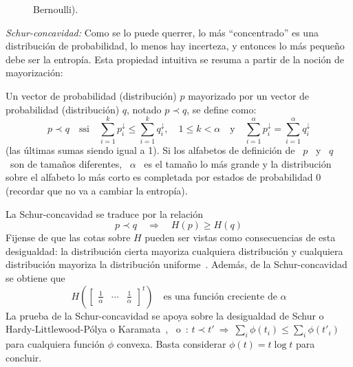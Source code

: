 \begin{propiedades}
\begin{figure}[h!]
{    Bernoulli).}
  \label{fig:SZ:Concavidad}
  \end{figure}
%
\setcounter{PropSchurConcavidad}{\value{enumi}}
\item\label{prop:SZ:Schurconcavidad}  {\it Schur-concavidad:}  Como se  lo puede
  querrer, lo  m\'as ``concentrado'' es  una distribuci\'on de  probabilidad, lo
  menos   hay  incerteza,   y  entonces   lo   m\'as  peque\~no   debe  ser   la
  entrop\'ia.  Esta propiedad intuitiva  se resuma  a partir  de la  noci\'on de
  mayorizaci\'on:
  \begin{definicion}[Mayorizaci\'on]\label{def:SZ:Mayorizacion}
    Un vector de  probabilidad (distribuci\'on) $p$ mayorizado por  un vector de
    probabilidad (distribuci\'on) $q$, notado $p \prec q$, se define como:
    \[
    p   \prec  q   \quad  \mbox{ssi}   \quad  \sum_{i=1}^k   p_i^\downarrow  \le
    \sum_{i=1}^k q_i^\downarrow,  \quad 1  \le k <  \alpha \quad  \mbox{y} \quad
    \sum_{i=1}^\alpha p_i^\downarrow = \sum_{i=1}^\alpha q_i^\downarrow
    \]
    (las \'ultimas sumas siendo igual a 1).  Si los alfabetos de definici\'on de
    \ $p$ \ y  \ $q$ \ son de tama\~nos diferentes, \  $\alpha$ \ es el tama\~no
    lo m\'as  grande y  la distribuci\'on  sobre el alfabeto  lo m\'as  corto es
    completada por  estados de probabilidad 0  (recordar que no va  a cambiar la
    entrop\'ia).
  \end{definicion}
  La  Schur-concavidad  se  traduce  por  la  relaci\'on
  \[
  p \prec  q \quad \Rightarrow  \quad H(p) \ge  H(q)
  \]
  Fijense de  que las cotas  sobre $H$ pueden  ser vistas como  consecuencias de
  esta desigualdad: la  distribuci\'on cierta mayoriza cualquiera distribuci\'on
  y  cualquiera distribuci\'on  mayoriza la  distribuci\'on uniforme~\cite[p.~9,
  (6)-(8)]{MarOlk11}.  Adem\'as, de la Schur-concavidad se obtiene que
  \[
  H\left( \begin{bmatrix}  \frac1\alpha & \cdots  & \frac1\alpha \end{bmatrix}^t
  \right) \quad \mbox{es una funci\'on creciente de } \alpha
  \]
  La prueba  de la  Schur-concavidad se  apoya sobre la  desigualdad de  Schur o
  Hardy-Littlewood-P\'olya    o     Karamata~\cite{Sch23,    HarLit29,    Kar32,
    HarLit52},~\cite[Cap.~3,                                 Prop.~C.1]{MarOlk11}
  o~\cite[Teorema~II.3.1]{Bha97}: $t \prec t' \: \Rightarrow \: \sum_i \phi(t_i)
  \le  \sum_i  \phi(t'_i)$  para  cualquiera  funci\'on  $\phi$  convexa.  Basta
  considerar $\phi(t) = t \log t$ para concluir.
\end{propiedades}
%


